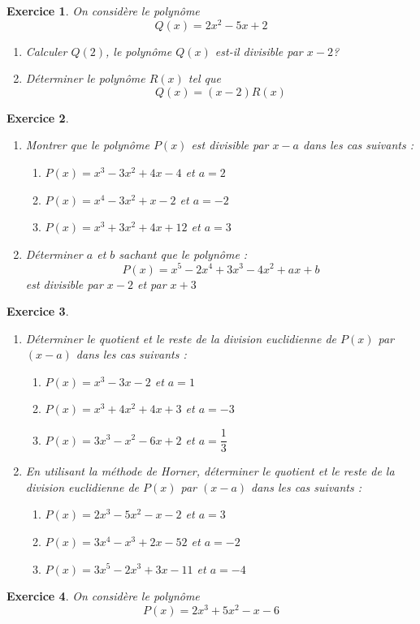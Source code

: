 \documentclass[12pt,a4paper]{article}
\theoremstyle{mystyle}
\newtheorem{exo}{Exercice}
\begin{document}
\begin{multicols*}{2}
\begin{exo}
On considère le polynôme \[Q(x) = 2x^2 - 5x + 2\]

\begin{enumerate}
    \item Calculer \(Q(2)\), le polynôme \(Q(x)\) est-il divisible par \(x - 2\)?
    \item Déterminer le polynôme \(R(x)\) tel que \[Q(x) = (x - 2)R(x)\]
\end{enumerate}
\end{exo}

\begin{exo}
\text{ }
\begin{enumerate}
    \item Montrer que le polynôme \(P(x)\) est divisible par \(x - a\) dans les cas suivants :
    \begin{enumerate}
        \item \(P(x) = x^3 - 3x^2 + 4x - 4\) et \(a = 2\)
        \item \(P(x) = x^4 - 3x^2 + x - 2\) et \(a = -2\)
        \item \(P(x) = x^3 + 3x^2 + 4x + 12\) et \(a = 3\)
    \end{enumerate}
    \item Déterminer \(a\) et \(b\) sachant que le polynôme :
    \[
    P(x) = x^5 - 2x^4 + 3x^3 - 4x^2 + ax + b
    \]
    est divisible par \(x - 2\) et par \(x + 3\)
\end{enumerate}
\end{exo}
\begin{exo}
\text{ }
\begin{enumerate}
    \item Déterminer le quotient et le reste de la division euclidienne de \(P(x)\) par \((x - a)\) dans les cas suivants :
    \begin{enumerate}
        \item \(P(x) = x^3 - 3x - 2\) et \(a = 1\)
        \item \(P(x) = x^3 + 4x^2 + 4x + 3\) et \(a = -3\)
        \item \(P(x) = 3x^3 - x^2 - 6x + 2\) et \(a = \dfrac{1}{3}\)
    \end{enumerate}
    \item En utilisant la méthode de Horner, déterminer le quotient et le reste de la division euclidienne de \(P(x)\) par \((x - a)\) dans les cas suivants :
    \begin{enumerate}
        \item \(P(x) = 2x^3 - 5x^2 - x - 2\) et \(a = 3\)
        \item \(P(x) = 3x^4 - x^3 + 2x - 52\) et \(a = -2\)
        \item \(P(x) = 3x^5 - 2x^3 + 3x - 11\) et \(a = -4\)
    \end{enumerate}
\end{enumerate}
\end{exo}
\begin{exo}
On considère le polynôme \[P(x) = 2x^3 + 5x^2 - x - 6\]


\end{exo}
\end{multicols*}
\end{document}
